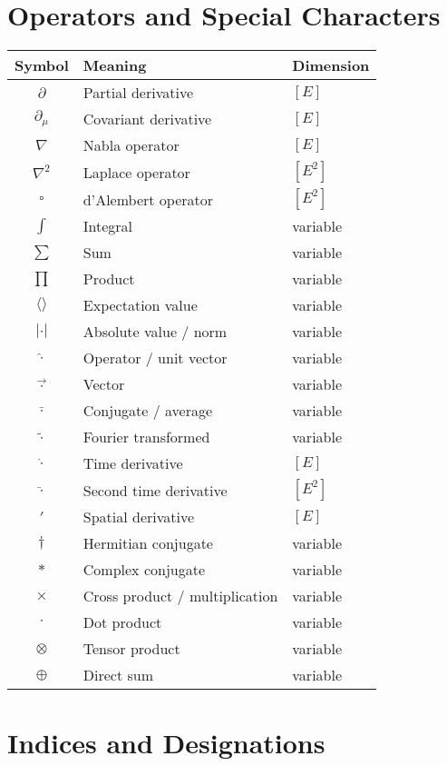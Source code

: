\documentclass[12pt,a4paper]{report}
\begin{document}
\section{Operators and Special Characters}
\label{sec:operators_special}

\begin{longtable}{|c|l|l|}
	\hline
	\textbf{Symbol} & \textbf{Meaning} & \textbf{Dimension} \\
	\hline
	$\partial$ & Partial derivative & $[E]$ \\
	$\partial_\mu$ & Covariant derivative & $[E]$ \\
	$\nabla$ & Nabla operator & $[E]$ \\
	$\nabla^2$ & Laplace operator & $[E^2]$ \\
	$\square$ & d'Alembert operator & $[E^2]$ \\
	$\int$ & Integral & variable \\
	$\sum$ & Sum & variable \\
	$\prod$ & Product & variable \\
	$\langle \rangle$ & Expectation value & variable \\
	$|\cdot|$ & Absolute value / norm & variable \\
	$\hat{\cdot}$ & Operator / unit vector & variable \\
	$\vec{\cdot}$ & Vector & variable \\
	$\bar{\cdot}$ & Conjugate / average & variable \\
	$\tilde{\cdot}$ & Fourier transformed & variable \\
	$\dot{\cdot}$ & Time derivative & $[E]$ \\
	$\ddot{\cdot}$ & Second time derivative & $[E^2]$ \\
	$\prime$ & Spatial derivative & $[E]$ \\
	$\dagger$ & Hermitian conjugate & variable \\
	$*$ & Complex conjugate & variable \\
	$\times$ & Cross product / multiplication & variable \\
	$\cdot$ & Dot product & variable \\
	$\otimes$ & Tensor product & variable \\
	$\oplus$ & Direct sum & variable \\
	\hline
\end{longtable}

\section{Indices and Designations}
\label{sec:indices_designations}
\end{document}
